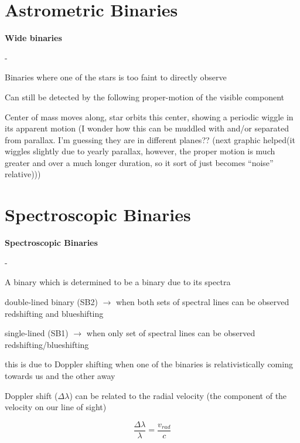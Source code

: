\section{Astrometric Binaries}
\noindent \textbf{\large Wide binaries} 
\begin{list}{-}{}
\item Binaries where one of the stars is too faint to directly observe
\item Can still be detected by the following \gls{proper-motion} of the visible component
\item Center of mass moves along, star orbits this center, showing a periodic wiggle in its apparent motion (I wonder how this can be muddled with and/or separated from parallax. I'm guessing they are in different planes?? (next graphic helped(it wiggles slightly due to yearly parallax, however, the proper motion is much greater and over a much longer duration, so it sort of just becomes ``noise'' relative)))
\end{list}
\section{Spectroscopic Binaries}
\noindent \textbf{\large Spectroscopic Binaries}
\begin{list}{-}{}
\item A binary which is determined to be a binary due to its spectra
\item double-lined binary (SB2) \(\rightarrow\) when both sets of spectral lines can be observed redshifting and blueshifting
\item single-lined (SB1) \(\rightarrow\) when only set of spectral lines can be observed redshifting/blueshifting
\item this is due to Doppler shifting when one of the binaries is relativistically coming towards us and the other away
\item Doppler shift (\(\Delta\lambda\)) can be related to the radial velocity (the component of the velocity on our line of sight)
\item \[\frac{\Delta\lambda}{\lambda} = \frac{v_{rad}}{c}\]
\end{list}
